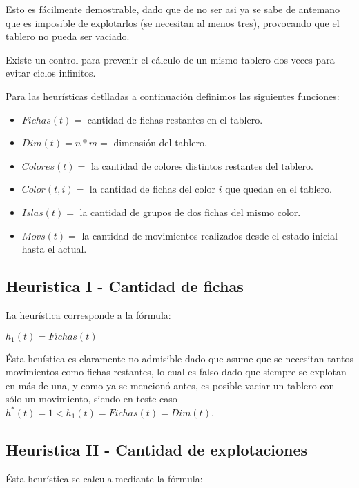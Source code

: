 \documentclass[%
    final,
    reprint,
    notitlepage,
    narroweqnarray,
    inline,
    twoside,
    invited
    ]{ieee}
\begin{document}
Esto es f\'acilmente demostrable, dado que de no ser asi ya se sabe de antemano que es imposible de explotarlos (se necesitan al menos tres), provocando que el tablero no pueda ser vaciado.\\
\par Existe un control para prevenir el c\'alculo de un mismo tablero dos veces para evitar ciclos infinitos.\\
\par Para las heur\'isticas detlladas a continuaci\'on definimos las siguientes funciones:\\
\begin{itemize}
\item $Fichas(t) =$ cantidad de fichas restantes en el tablero.
\item $Dim(t) = n*m =$ dimensi\'on del tablero.
\item $Colores(t) =$ la cantidad de colores distintos restantes del tablero.
\item $Color(t, i) =$ la cantidad de fichas del color $i$ que quedan en el tablero.
\item $Islas(t) =$ la cantidad de grupos de dos fichas del mismo color.
\item $Movs(t) =$ la cantidad de movimientos realizados desde el estado inicial hasta el actual.
\end{itemize}
\subsection{Heuristica I - Cantidad de fichas}
La heur\'istica corresponde a la f\'ormula:\\

\begin{center}
\begin{math}
h_1(t) = Fichas(t)
\end{math}\\
\end{center}

\par \'Esta heu\'istica es claramente no admisible dado que asume que se necesitan tantos movimientos como fichas restantes, lo cual es falso dado que siempre se explotan en m\'as de una, y como ya se mencion\'o antes, es posible vaciar un tablero con s\'olo un movimiento, siendo en teste caso $h^*(t)=1 < h_1(t) = Fichas(t) = Dim(t)$.\\

\subsection{Heuristica II - Cantidad de explotaciones}
\'Esta heur\'istica se calcula mediante la f\'ormula:\\
\end{document}
